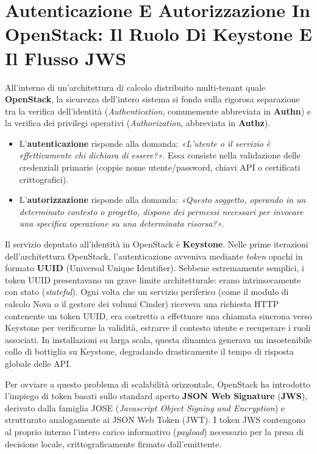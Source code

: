 \documentclass[11pt, a4paper]{article}
\begin{document}

\section{Autenticazione E Autorizzazione In OpenStack: Il Ruolo Di Keystone E Il Flusso JWS}

All'interno di un'architettura di calcolo distribuito multi-tenant quale \textbf{OpenStack}, la sicurezza dell'intero sistema si fonda sulla rigorosa separazione tra la verifica dell'identità (\emph{Authentication}, comunemente abbreviata in \textbf{Authn}) e la verifica dei privilegi operativi (\emph{Authorization}, abbreviata in \textbf{Authz}).
\begin{itemize}[noitemsep]
    \item L'\textbf{autenticazione} risponde alla domanda: \emph{«L'utente o il servizio è effettivamente chi dichiara di essere?»}. Essa consiste nella validazione delle credenziali primarie (coppie nome utente/password, chiavi API o certificati crittografici).
    \item L'\textbf{autorizzazione} risponde alla domanda: \emph{«Questo soggetto, operando in un determinato contesto o progetto, dispone dei permessi necessari per invocare una specifica operazione su una determinata risorsa?»}.
\end{itemize}

Il servizio deputato all'identità in OpenStack è \textbf{Keystone}. Nelle prime iterazioni dell'architettura OpenStack, l'autenticazione avveniva mediante \emph{token} opachi in formato \textbf{UUID} (Universal Unique Identifier). Sebbene estremamente semplici, i token UUID presentavano un grave limite architetturale: erano intrinsecamente con stato (\emph{stateful}). Ogni volta che un servizio periferico (come il modulo di calcolo Nova o il gestore dei volumi Cinder) riceveva una richiesta HTTP contenente un token UUID, era costretto a effettuare una chiamata sincrona verso Keystone per verificarne la validità, estrarre il contesto utente e recuperare i ruoli associati. In installazioni su larga scala, questa dinamica generava un insostenibile collo di bottiglia su Keystone, degradando drasticamente il tempo di risposta globale delle API.

Per ovviare a questo problema di scalabilità orizzontale, OpenStack ha introdotto l'impiego di token basati sullo standard aperto \textbf{JSON Web Signature} (\textbf{JWS}), derivato dalla famiglia JOSE (\emph{Javascript Object Signing and Encryption}) e strutturato analogamente ai JSON Web Token (JWT). I token JWS contengono al proprio interno l'intero carico informativo (\emph{payload}) necessario per la presa di decisione locale, crittograficamente firmato dall'emittente.
\end{document}

